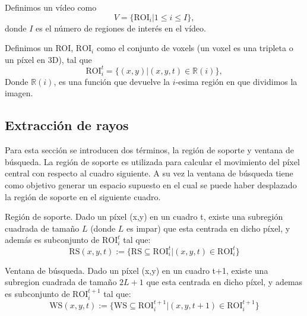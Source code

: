 	Definimos un vídeo como 
	\begin{equation}\label{algoritmo:eq:video}		
		V = \{\text{ROI}_i | 1 \leq i \le I\}, 
	\end{equation}
	donde $I$ es el número de regiones de interés en el vídeo.
	
	Definimos un ROI, $\text{ROI}_i$ como el conjunto de voxels (un voxel es una tripleta o un píxel en 3D), tal que
	\begin{equation}\label{algoritmo:eq:roi}
		\text{ROI}_{i}^{t} = \{(x,y) | (x,y,t) \in \mathds{R}(i)\},
	\end{equation}
	Donde $\mathds{R}(i)$, es una función que devuelve la $i$-esima región en que dividimos la imagen.

	\subsection{Extracción de rayos}
	\label{algoritmo:ext_rayos}
	
	Para esta sección se introducen dos términos, la región de soporte y ventana de búsqueda.
	La región de soporte es utilizada para calcular el movimiento del píxel central con respecto al cuadro siguiente. A su vez la ventana de búsqueda tiene como objetivo generar un espacio supuesto en el cual se puede haber desplazado la región de soporte en el siguiente cuadro.
	
	\begin{definition}	
	{Región de soporte.} Dado un píxel (x,y) en un cuadro t, existe una subregión cuadrada de tamaño $L$ (donde $L$ es impar) que esta centrada en dicho píxel, y además es subconjunto de $\text{ROI}_i^t$ tal que:
		\begin{equation}
			\text{RS}(x,y,t) := \{\text{RS} \subseteq \text{ROI}_i^t | (x,y,t) \in \text{ROI}_i^t \} 
		\end{equation}
	
	
	\end{definition}

	\begin{definition}
	{Ventana de búsqueda.} Dado un píxel (x,y) en un cuadro t+1, existe una subregion cuadrada de tamaño $2L+1$ que esta centrada en dicho píxel, y ademas es subconjunto de $\text{ROI}_{i}^{t+1}$ tal que:
	\begin{equation}
		\text{WS}(x,y,t) := \{\text{WS} \subseteq \text{ROI}_{i}^{t+1} | (x,y,t+1) \in \text{ROI}_{i}^{t+1} \} 
	\end{equation}
	
	\end{definition}
		
